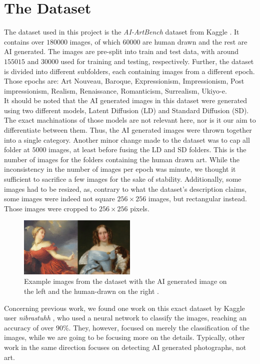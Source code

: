 \chapter{The Dataset}
\label{ch:dataset}

The dataset used in this project is the \textit{AI-ArtBench} dataset from Kaggle \cite{aiartbench}.
It contains over $180000$ images, of which $60000$ are human drawn and the rest are AI generated.
The images are pre-split into train and test data, with around $155015$ and $30000$ used for training and testing, respectively.
Further, the dataset is divided into different subfolders, each containing images from a different epoch.
Those epochs are: Art Nouveau, Baroque, Expressionism, Impressionism, Post impressionism, Realism, Renaissance, Romanticism, Surrealism, Ukiyo-e. \\

It should be noted that the AI generated images in this dataset were generated using two different models, Latent Diffusion (LD) and Standard Diffusion (SD).
The exact machinations of those models are not relevant here, nor is it our aim to differentiate between them.
Thus, the AI generated images were thrown together into a single category.
Another minor change made to the dataset was to cap all folder at $5000$ images, at least before fusing the LD and SD folders.
This is the number of images for the folders containing the human drawn art.
While the inconsistency in the number of images per epoch was minute, we thought it sufficient to sacrifice a few images for the sake of stability.
Additionally, some images had to be resized, as, contrary to what the dataset's description claims, some images were indeed not square $256 \times 256$ images,
but rectangular instead.
Those images were cropped to $256 \times 256$ pixels. \\

\begin{figure}
    \centering
    \includegraphics[width=0.5\textwidth]{images/Example_images.png}
    \caption{Example images from the dataset with the AI generated image on the left and the human-drawn on the right \cite{aiartbench}.}
    \label{fig:example_images}
\end{figure}

Concerning previous work, we found one work on this exact dataset by Kaggle user \textit{nibrastuhh} \cite{useraiartbench}, who used
a neural network to classify the images, reaching an accuracy of over $90\%$.
They, however, focused on merely the classification of the images, while we are going to be focusing more on the details.
Typically, other work in the same direction focuses on detecting AI generated photographs, not art.

